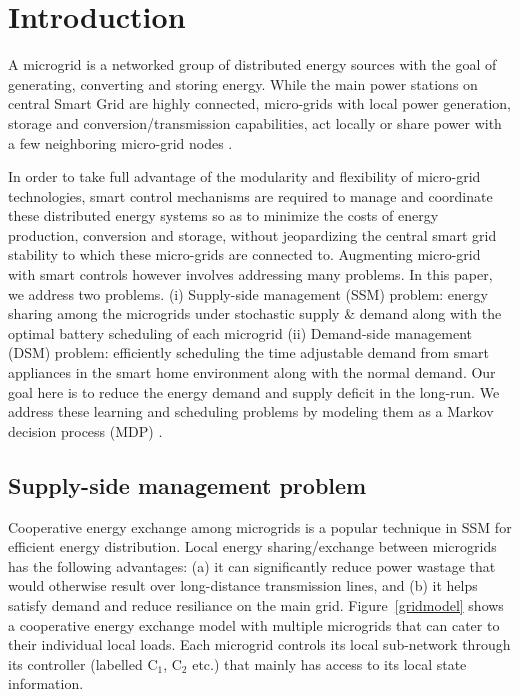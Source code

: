\section{Introduction}

A microgrid is a networked group of distributed energy sources with the goal of generating, converting and storing energy. While the main power stations on central Smart Grid are highly connected, micro-grids with local power generation, storage and conversion/transmission capabilities, act locally or share power with a few neighboring micro-grid nodes \cite{farhangi2010path}.

In order to take full advantage of the modularity and flexibility of micro-grid technologies, smart control mechanisms are required to manage and coordinate these distributed energy systems so as to minimize the costs of energy production, conversion and storage, without jeopardizing the central smart grid stability to which these micro-grids are connected to. Augmenting micro-grid with smart controls however involves addressing many problems. In this paper, we address two  problems. (i) Supply-side management (SSM) problem: energy sharing among the microgrids under stochastic supply \& demand along with the optimal battery scheduling of each microgrid (ii) Demand-side management (DSM) problem: efficiently scheduling the time adjustable demand from smart appliances in the smart home environment along with the normal demand. Our goal here is to reduce the energy demand and supply deficit in the long-run. We address these learning and scheduling problems by modeling them as a Markov decision process (MDP) \cite{puterman2014markov}.

\subsection{Supply-side management problem}
Cooperative energy exchange among microgrids is a popular technique in SSM for efficient energy distribution.  Local energy sharing/exchange between microgrids has the following advantages:
(a) it can significantly reduce power wastage that would otherwise result over long-distance transmission lines, and (b) it helps satisfy demand and reduce resiliance on the main grid. Figure~\ref{gridmodel} shows a cooperative energy exchange model with multiple microgrids that can cater to their individual local loads. Each microgrid controls its local sub-network through its controller (labelled $\mbox{C}_1$, $\mbox{C}_2$ etc.) that mainly has access to its local state information.


